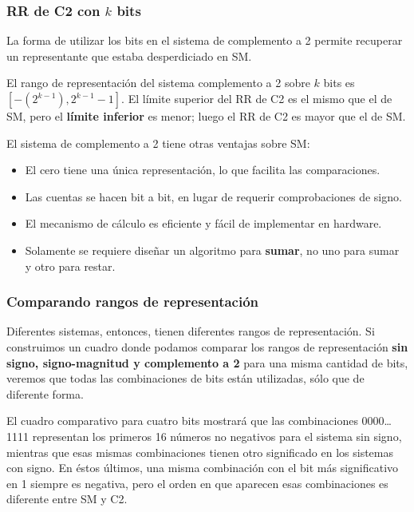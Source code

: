 \documentclass[spanish,a4paper,]{article}
\providecommand{\tightlist}{%
  \setlength{\itemsep}{0pt}\setlength{\parskip}{0pt}}
\begin{document}
\hypertarget{rr-de-c2-con-k-bits}{%
\subsubsection{\texorpdfstring{RR de C2 con \(k\)
bits}{RR de C2 con k bits}}\label{rr-de-c2-con-k-bits}}

La forma de utilizar los bits en el sistema de complemento a 2 permite
recuperar un representante que estaba desperdiciado en SM.

El rango de representación del sistema complemento a 2 sobre \(k\) bits
es \([-(2^{k-1}), 2^{k-1}-1]\). El límite superior del RR de C2 es el
mismo que el de SM, pero el \textbf{límite inferior} es menor; luego el
RR de C2 es mayor que el de SM.

El sistema de complemento a 2 tiene otras ventajas sobre SM:

\begin{itemize}
\tightlist
\item
  El cero tiene una única representación, lo que facilita las
  comparaciones.
\item
  Las cuentas se hacen bit a bit, en lugar de requerir comprobaciones de
  signo.
\item
  El mecanismo de cálculo es eficiente y fácil de implementar en
  hardware.
\item
  Solamente se requiere diseñar un algoritmo para \textbf{sumar}, no uno
  para sumar y otro para restar.
\end{itemize}

\hypertarget{comparando-rangos-de-representaciuxf3n}{%
\subsubsection{Comparando rangos de
representación}\label{comparando-rangos-de-representaciuxf3n}}

Diferentes sistemas, entonces, tienen diferentes rangos de
representación. Si construimos un cuadro donde podamos comparar los
rangos de representación \textbf{sin signo, signo-magnitud y complemento
a 2} para una misma cantidad de bits, veremos que todas las
combinaciones de bits están utilizadas, sólo que de diferente forma.

El cuadro comparativo para cuatro bits mostrará que las combinaciones
0000\ldots{}1111 representan los primeros 16 números no negativos para
el sistema sin signo, mientras que esas mismas combinaciones tienen otro
significado en los sistemas con signo. En éstos últimos, una misma
combinación con el bit más significativo en 1 siempre es negativa, pero
el orden en que aparecen esas combinaciones es diferente entre SM y C2.
\end{document}
